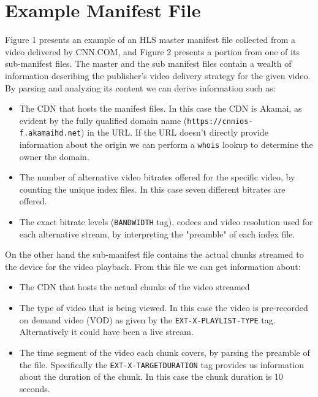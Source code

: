 \documentclass[]{sig-alternate-10pt}
\begin{document}
\hypertarget{example-manifest-file}{%
\section{Example Manifest File}\label{example-manifest-file}}

Figure 1 presents an example of an HLS master manifest file collected
from a video delivered by CNN.COM, and Figure 2 presents a portion from
one of its sub-manifest files. The master and the sub manifest files
contain a wealth of information describing the publisher's video
delivery strategy for the given video. By parsing and analyzing its
content we can derive information such as:

\begin{itemize}
\item The CDN that hosts the manifest files. In this case the CDN is Akamai, as evident by the fully qualified domain name (\texttt{https://cnnios-f.akamaihd.net}) in the URL. If the URL doesn't directly provide information about the origin we can perform a \texttt{whois} lookup to determine the owner the domain.
\item The number of alternative video bitrates offered for the specific video, by counting the unique index files. In this case seven different bitrates are offered.
\item The exact bitrate levels (\texttt{BANDWIDTH} tag), codecs and video resolution used for each alternative stream, by interpreting the "preamble" of each index file.
\end{itemize}

On the other hand the sub-manifest file contains the actual chunks
streamed to the device for the video playback. From this file we can get
information about:

\begin{itemize}
\item The CDN that hosts the actual chunks of the video streamed
\item The type of video that is being viewed. In this case the video is pre-recorded on demand video (VOD) as given by the \texttt{EXT-X-PLAYLIST-TYPE} tag. Alternatively it could have been a live stream.
\item The time segment of the video each chunk covers, by parsing the preamble of the file. Specifically the \texttt{EXT-X-TARGETDURATION} tag provides us information about the duration of the chunk. In this case the chunk duration is 10 seconds.
\end{itemize}
\end{document}
